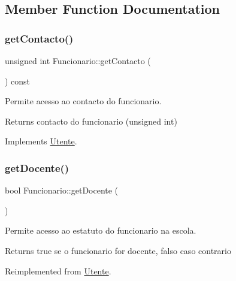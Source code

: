 \subsection{Member Function Documentation}
\mbox{\label{class_funcionario_a408d2f4ac6ebdebbc18072832fce9ef7}} 
\subsubsection{\texorpdfstring{get\+Contacto()}{getContacto()}}
{\footnotesize\ttfamily unsigned int Funcionario\+::get\+Contacto (\begin{DoxyParamCaption}{ }\end{DoxyParamCaption}) const\hspace{0.3cm}{\ttfamily [virtual]}}



Permite acesso ao contacto do funcionario. 

\begin{DoxyReturn}{Returns}
contacto do funcionario (unsigned int) 
\end{DoxyReturn}


Implements \mbox{\hyperlink{class_utente}{Utente}}.

\mbox{\label{class_funcionario_a298a2b333cae15e6f426890c2a352dc2}} 
\subsubsection{\texorpdfstring{get\+Docente()}{getDocente()}}
{\footnotesize\ttfamily bool Funcionario\+::get\+Docente (\begin{DoxyParamCaption}{ }\end{DoxyParamCaption})\hspace{0.3cm}{\ttfamily [virtual]}}



Permite acesso ao estatuto do funcionario na escola. 

\begin{DoxyReturn}{Returns}
true se o funcionario for docente, falso caso contrario 
\end{DoxyReturn}


Reimplemented from \mbox{\hyperlink{class_utente}{Utente}}.

